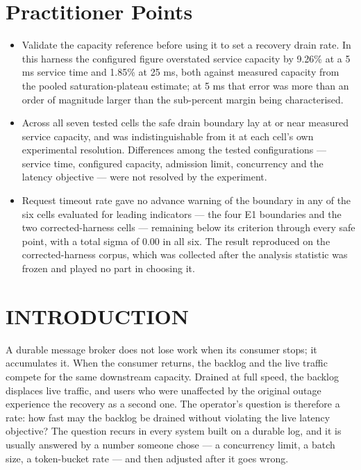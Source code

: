 \documentclass{ieeeaccess}
\begin{document}
\titlepgskip=-15pt
\maketitle

\section*{Practitioner Points}
\begin{itemize}
\item Validate the capacity reference before using it to set a recovery drain rate. In this harness the configured figure overstated service capacity by 9.26\% at a 5 ms service time and 1.85\% at 25 ms, both against measured capacity from the pooled saturation-plateau estimate; at 5 ms that error was more than an order of magnitude larger than the sub-percent margin being characterised.
\item Across all seven tested cells the safe drain boundary lay at or near measured service capacity, and was indistinguishable from it at each cell's own experimental resolution. Differences among the tested configurations --- service time, configured capacity, admission limit, concurrency and the latency objective --- were not resolved by the experiment.
\item Request timeout rate gave no advance warning of the boundary in any of the six cells evaluated for leading indicators --- the four E1 boundaries and the two corrected-harness cells --- remaining below its criterion through every safe point, with a total sigma of 0.00 in all six. The result reproduced on the corrected-harness corpus, which was collected after the analysis statistic was frozen and played no part in choosing it.
\end{itemize}

\section{INTRODUCTION}

A durable message broker does not lose work when its consumer stops; it accumulates it. When the consumer returns, the backlog and the live traffic compete for the same downstream capacity. Drained at full speed, the backlog displaces live traffic, and users who were unaffected by the original outage experience the recovery as a second one. The operator's question is therefore a rate: how fast may the backlog be drained without violating the live latency objective? The question recurs in every system built on a durable log, and it is usually answered by a number someone chose --- a concurrency limit, a batch size, a token-bucket rate --- and then adjusted after it goes wrong.
\end{document}

